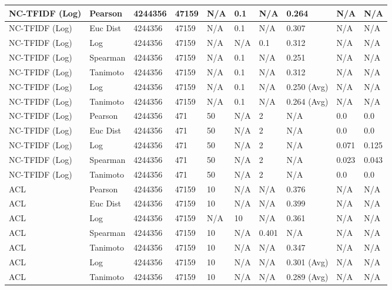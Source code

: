 \documentclass{article}
\begin{document}
\begin{longtable}{ |p{1.7cm}|p{1.9cm}|p{1.5cm}|p{1.5cm}|p{0.75cm}|p{0.75cm}|p{0.75cm}|p{0.75cm}|p{1.5cm}|p{1.5cm}|}
    NC-TFIDF (Log) & Pearson & 4244356 & 47159 & N/A & 0.1 & N/A & 0.264 & N/A & N/A  \\ \hline
    NC-TFIDF (Log) & Euc Dist & 4244356 & 47159 & N/A & 0.1 & N/A & 0.307 & N/A & N/A   \\ \hline
    NC-TFIDF (Log) & Log & 4244356 & 47159 & N/A &  N/A & 0.1 & 0.312 & N/A & N/A  \\ \hline
    NC-TFIDF (Log)   & Spearman & 4244356 & 47159 & N/A & 0.1 & N/A & 0.251 & N/A & N/A \\ \hline
    NC-TFIDF (Log)   & Tanimoto & 4244356 & 47159 & N/A & 0.1 & N/A & 0.312 & N/A & N/A \\ \hline
    NC-TFIDF (Log)  & Log & 4244356 & 47159 & N/A & 0.1 & N/A & 0.250 (Avg) & N/A & N/A \\ \hline
    NC-TFIDF (Log) & Tanimoto & 4244356 & 47159 & N/A & 0.1 & N/A & 0.264 (Avg) & N/A & N/A \\ \hline
    
    NC-TFIDF (Log)  & Pearson & 4244356 & 471 & 50 & N/A  & 2 & N/A & 0.0 & 0.0  \\ \hline
    NC-TFIDF (Log)  & Euc Dist & 4244356 & 471 & 50 & N/A  & 2 & N/A &0.0 & 0.0   \\ \hline
    NC-TFIDF (Log)  & Log & 4244356 & 471 & 50 & N/A & 2 & N/A & 0.071 & 0.125  \\ \hline
    NC-TFIDF (Log)  & Spearman & 4244356 & 471 & 50 & N/A  & 2 & N/A &0.023 & 0.043 \\ \hline
    NC-TFIDF (Log)  & Tanimoto & 4244356 & 471 & 50 & N/A  & 2 & N/A & 0.0 & 0.0 \\ \hline

    ACL & Pearson & 4244356 & 47159 & 10 & N/A & N/A & 0.376 & N/A & N/A  \\ \hline
    ACL & Euc Dist & 4244356 & 47159 & 10 & N/A & N/A & 0.399 & N/A & N/A   \\ \hline
    ACL & Log & 4244356 & 47159 & N/A &  10 & N/A& 0.361 & N/A & N/A  \\ \hline
    ACL & Spearman & 4244356 & 47159 & 10 & N/A & 0.401 & N/A & N/A & N/A \\ \hline
    ACL & Tanimoto & 4244356 & 47159 & 10 & N/A& N/A & 0.347 & N/A & N/A \\ \hline
    ACL & Log & 4244356 & 47159 & 10 & N/A& N/A & 0.301 (Avg) & N/A & N/A \\ \hline
    ACL & Tanimoto & 4244356 & 47159 & 10 & N/A & N/A & 0.289 (Avg) & N/A & N/A \\ \hline
    

\end{longtable}
\end{document}
